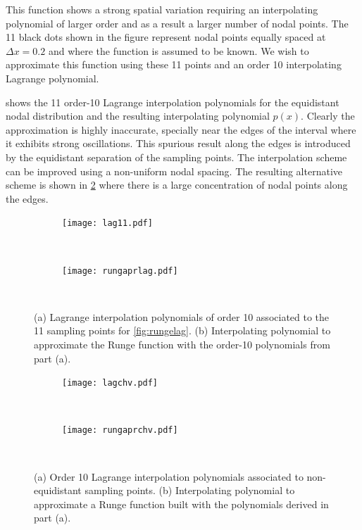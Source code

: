 This function shows a strong spatial variation requiring an interpolating polynomial of larger order and as a result a larger number of nodal points. The 11 black dots shown in the figure represent nodal points equally spaced at $\Delta x = 0.2$ and where the function is assumed to be known. We wish to approximate this function using these 11 points and an order 10 interpolating Lagrange polynomial.



 shows the 11 order-10 Lagrange interpolation polynomials for the equidistant nodal distribution and the resulting interpolating polynomial $p(x)$. Clearly the approximation is highly inaccurate, specially near the edges of the interval where it exhibits strong oscillations. This spurious result along the edges is introduced by the equidistant separation of the sampling points. The interpolation scheme can be improved using a non-uniform nodal spacing. The resulting alternative scheme is shown in  \cref{fig:rungechevy} where there is a large concentration of nodal points along the edges.

\begin{figure}[H]
\centering
	\begin{subfigure}[b]{0.50\textwidth}\qquad
		\texttt{[image: lag11.pdf]}
		\caption{}
	\end{subfigure}\,
%
	\begin{subfigure}[b]{0.45\textwidth}\qquad
		\texttt{[image: rungaprlag.pdf]}
		\caption{}
	\end{subfigure}\\

\caption{(a) Lagrange interpolation polynomials of order 10 associated to the 11 sampling points for \cref{fig:rungelag}. (b) Interpolating polynomial to approximate the Runge function with the order-10 polynomials from part (a).}
\label{fig:rungeequi}
\end{figure}


\begin{figure}[H]
\centering
	\begin{subfigure}[b]{0.50\textwidth}\qquad
		\texttt{[image: lagchv.pdf]}
		\caption{}
	\end{subfigure}\,
%
	\begin{subfigure}[b]{0.45\textwidth}\qquad
		\texttt{[image: rungaprchv.pdf]}
		\caption{}
	\end{subfigure}\\

\caption{(a) Order 10 Lagrange interpolation polynomials associated to non-equidistant sampling points. (b) Interpolating polynomial to approximate a Runge function built with the polynomials derived in part (a).}
\label{fig:rungechevy}
\end{figure}


